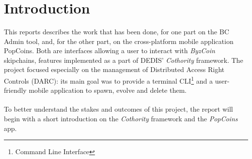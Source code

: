 \section{Introduction}


\paragraph{}

This reports describes the work that has been done, for one part on the BC Admin tool, and, for the other part, on the cross-platform mobile application PopCoins. Both are interfaces allowing a user to interact with \textit{ByzCoin} skipchains, features implemented as a part of DEDIS' \textit{Cothority} framework. The project focused especially on the management of Distributed Access Right Controls (DARC): its main goal was to provide a terminal CLI\footnote{Command Line Interface} and a user-friendly mobile application to spawn, evolve and delete them.

\paragraph{}

To better understand the stakes and outcomes of this project, the report will begin with a short introduction on the \textit{Cothority} framework and the \textit{PopCoins} app.